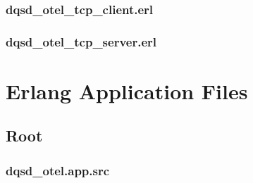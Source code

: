 \subsubsection*{dqsd\_otel\_tcp\_client.erl}


\subsubsection*{dqsd\_otel\_tcp\_server.erl}


\section{Erlang Application Files}

\subsection*{Root}

\subsubsection*{dqsd\_otel.app.src}

